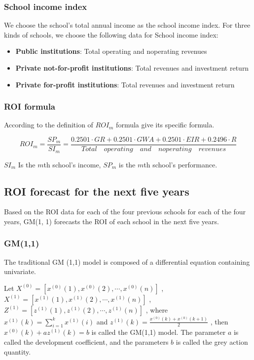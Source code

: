 \documentclass{mcmthesis}
\newcommand{\upcite}[1]{\textsuperscript{\textsuperscript{\cite{#1}}}}
\begin{document}
\subsubsection{School income index}

We choose the school's total annual income as the school income index. For three kinds of schools, we choose the following data for School income index:

\begin{itemize}
	\item \textbf{Public institutions}: Total operating and noperating revenues
	\item \textbf{Private not-for-profit institutions}: Total revenues and investment return
	\item \textbf{Private for-profit institutions}: Total revenues and investment return
\end{itemize}

\subsubsection{ROI formula}
According to the definition of $ROI_m$ formula give its specific formula.

\begin{equation}
	\label{eq17}
	ROI_m = \frac{SP_m}{SI_m} = \frac{0.2501\cdot GR + 0.2501\cdot GWA + 0.2501\cdot EIR +0.2496\cdot R}{Total\quad operating\quad and\quad noperating\quad revenues}
\end{equation}

$SI_m$ Is the $m$th school's income, $SP_m$ is the $m$th school's performance. 

\subsection{ROI forecast for the next five years}

\par Based on the ROI data for each of the four previous schools for each of the four years, GM(1, 1) forecasts the ROI of each school in the next five years.

\subsubsection{GM(1,1)}

\par The traditional GM (1,1) model\upcite{gm} is composed of a differential equation containing univariate.
\par Let $X^{(0)}=[x^{(0)}(1), x^{(0)}(2),\cdots ,x^{(0)}(n)]$ , $X^{(1)}=[x^{(1)}(1), x^{(1)}(2),\cdots ,x^{(1)}(n)]$ , $Z^{(1)}=[z^{(1)}(1), z^{(1)}(2),\cdots ,z^{(1)}(n)]$ , where $x^{(1)}(k) =  \sum\limits_{i=1}^k x^{(1)}(i)$ and $z^{(1)}(k) = \frac{x^{(0)}(k) + x^{(0)}(k+1)}{2}$ , then $x^{(0)}(k) + a z^{(1)}(k) = b$ is called the GM(1,1) model. The parameter $a$ is called the development coefficient, and the parameters $b$ is called the grey action quantity.
 
\end{document}
